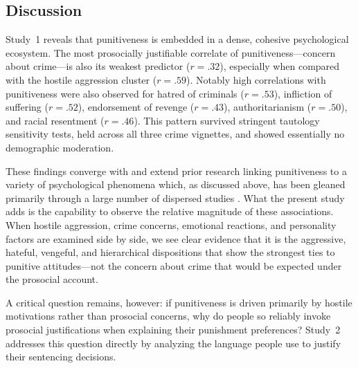 \subsection{Discussion}

Study~1 reveals that punitiveness is embedded in a dense, cohesive psychological ecosystem. The most prosocially justifiable correlate of punitiveness---concern about crime---is also its weakest predictor ($r = .32$), especially when compared with the hostile aggression cluster ($r = .59$). Notably high correlations with punitiveness were also observed for hatred of criminals ($r = .53$), infliction of suffering ($r = .52$), endorsement of revenge ($r = .43$), authoritarianism ($r = .50$), and racial resentment ($r = .46$). This pattern survived stringent tautology sensitivity tests, held across all three crime vignettes, and showed essentially no demographic moderation.

These findings converge with and extend prior research linking punitiveness to a variety of psychological phenomena which, as discussed above, has been gleaned primarily through a large number of dispersed studies \citep{GerberJackson2013, GoldbergLernerTetlock1999, Ho2002, Jackson2019}. What the present study adds is the capability to observe the relative magnitude of these associations. When hostile aggression, crime concerns, emotional reactions, and personality factors are examined side by side, we see clear evidence that it is the aggressive, hateful, vengeful, and hierarchical dispositions that show the strongest ties to punitive attitudes---not the concern about crime that would be expected under the prosocial account.

A critical question remains, however: if punitiveness is driven primarily by hostile motivations rather than prosocial concerns, why do people so reliably invoke prosocial justifications when explaining their punishment preferences? Study~2 addresses this question directly by analyzing the language people use to justify their sentencing decisions.